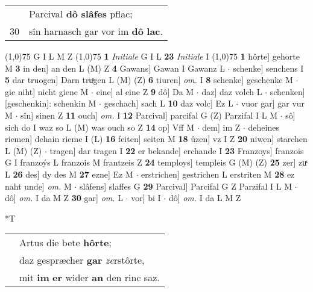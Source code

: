 \documentclass[8pt,a4paper,notitlepage]{article}
\begin{document}
\begin{table}[ht]
\begin{minipage}[t]{0.5\linewidth}
\begin{tabular}{rl}
 & Parcival \textbf{dô} \textbf{slâfes} pflac;\\ 
30 & sîn harnasch gar vor im \textbf{dô} \textbf{lac}.\\ 
\end{tabular}
\scriptsize
\line(1,0){75} \newline
G I L M Z \newline
\line(1,0){75} \newline
\textbf{1} \textit{Initiale} G I L  \textbf{23} \textit{Initiale} I  \newline
\line(1,0){75} \newline
\textbf{1} hôrte] gehorte M \textbf{3} in den] an den L (M) Z \textbf{4} Gawans] Gawan I Gawanz L  $\cdot$ schenke] senchens I \textbf{5} dar truogen] Darn truͯgen L (M) (Z) \textbf{6} tiuren] \textit{om.} I \textbf{8} schenke] geschenke M  $\cdot$ gie niht] nicht gienc M  $\cdot$ eine] al eine Z \textbf{9} dô] Da M  $\cdot$ daz] daz volch L  $\cdot$ schenken] [geschenkin]: schenkin M  $\cdot$ geschach] sach L \textbf{10} daz volc] Ez L  $\cdot$ vuor gar] gar vur M  $\cdot$ sîn] sinen Z \textbf{11} ouch] \textit{om.} I \textbf{12} Parcival] parcifal G (Z) Parzifal I L M  $\cdot$ sô] sich do I waz so L (M) was ouch so Z \textbf{14} op] Vff M  $\cdot$ dem] im Z  $\cdot$ deheines riemen] dehain rieme I (L) \textbf{16} feiten] seiten M \textbf{18} ûzen] vz I Z \textbf{20} niwen] starchen L (M) (Z)  $\cdot$ tragen] dar tragen I \textbf{22} er bekande] erchande I \textbf{23} Franzoys] franzois G I franzoýs L franzois M frantzeis Z \textbf{24} temploys] templeis G (M) (Z) \textbf{25} zer] zuͯ L \textbf{26} des] dy des M \textbf{27} ezne] Ez M  $\cdot$ erstrichen] gestrichen L erstriten M \textbf{28} ez naht unde] \textit{om.} M  $\cdot$ slâfens] slaffes G \textbf{29} Parcival] Parcifal G Z Parzifal I L M  $\cdot$ dô] \textit{om.} I da M Z \textbf{30} gar] \textit{om.} L  $\cdot$ vor] bi I  $\cdot$ dô] \textit{om.} I da L M Z \newline
\end{minipage}
\hspace{0.5cm}
\begin{minipage}[t]{0.5\linewidth}
\small
\begin{center}*T
\end{center}
\begin{tabular}{rl}
 & Artus die bete \textbf{hôrte};\\ 
 & daz gespræcher \textbf{gar} \textit{ze}rstôrte,\\ 
 & mit \textbf{im} \textbf{er} wider \textbf{an} den rinc saz.\\ 

\end{tabular}
\end{minipage}
\end{table}
\end{document}
